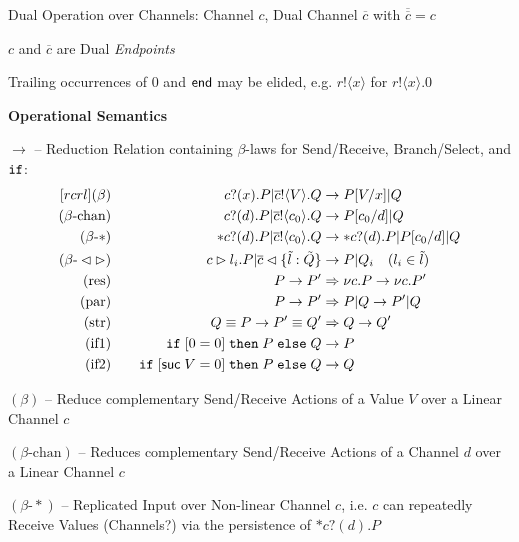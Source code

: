 Dual Operation over Channels: Channel $c$, Dual Channel $\overline{c}$
with $\overline{\overline{c}} = c$

$c$ and $\overline{c}$ are Dual \emph{Endpoints}

\fist Trailing occurrences of $0$ and $\mathsf{end}$ may be elided, e.g.
$r!\langle x \rangle$ for $r!\langle x \rangle.0$


\textbf{Operational Semantics}

$\rightarrow$ -- Reduction Relation containing $\beta$-laws for
Send/Receive, Branch/Select, and $\mathtt{if}$:
\[
\begin{aligned}[r c r l]
  (\beta) & \quad & c?(x).P | \overline{c}!\langle V \rangle.Q
    & \rightarrow P[V/x] | Q \\
  (\beta\text{-chan}) & \quad
    & c?(d).P | \overline{c}!\langle c_0 \rangle.Q
    & \rightarrow P[c_0/d] | Q \\
  (\beta\text{-}*) & \quad
    & *c?(d).P | \overline{c}!\langle c_0 \rangle.Q
    & \rightarrow *c?(d).P | P[c_0/d] | Q \\
  (\beta\text{-}\lhd\rhd) & \quad
    & c \rhd l_i.P | \overline{c} \lhd \{\tilde{l}:\tilde{Q}\}
    & \rightarrow P | Q_i \quad (l_i \in \tilde{l}) \\
  (\text{res}) & \quad
    & P \rightarrow P'
    & \Rightarrow \nu c.P \rightarrow \nu c.P' \\
  (\text{par}) & \quad
    & P \rightarrow P'
    & \Rightarrow P | Q \rightarrow P' | Q \\
  (\text{str}) & \quad
    & Q \equiv P \rightarrow P' \equiv Q'
    & \Rightarrow Q \rightarrow Q' \\
  (\text{if1}) & \quad
    & \mono{if}\; [0=0] \;\mono{then}\; P \;\mono{else}\; Q
    & \rightarrow P \\
  (\text{if2}) & \quad
    & \mono{if}\; [\suc\; V = 0] \;\mono{then}\; P \;\mono{else}\; Q
    & \rightarrow Q  \\
\end{aligned}
\]


$(\beta)$ -- Reduce complementary Send/Receive Actions of a Value $V$
over a Linear Channel $c$

$(\beta\text{-chan})$ -- Reduces complementary Send/Receive Actions of
a Channel $d$ over a Linear Channel $c$

$(\beta\text{-}*)$ -- Replicated Input over Non-linear Channel $c$,
i.e. $c$ can repeatedly Receive Values (Channels?) via the persistence
of $*c?(d).P$

